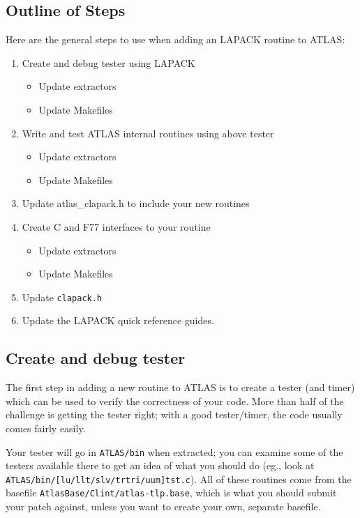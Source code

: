 \documentclass[11pt]{article}
\begin{document}
\subsection{Outline of Steps}
Here are the general steps to use when adding an LAPACK routine to ATLAS:
\begin{enumerate}
\item Create and debug tester using LAPACK
      \begin{itemize}
      \item Update extractors
      \item Update Makefiles
      \end{itemize}
\item Write and test ATLAS internal routines using above tester
      \begin{itemize}
      \item Update extractors
      \item Update Makefiles
      \end{itemize}
\item Update atlas\_clapack.h to include your new routines
\item Create C and F77 interfaces to your routine
      \begin{itemize}
      \item Update extractors
      \item Update Makefiles
      \end{itemize}
\item Update {\tt clapack.h}
\item Update the LAPACK quick reference guides.
\end{enumerate}

\subsection{Create and debug tester}

The first step in adding a new routine to ATLAS is to create a tester
(and timer) which can be used to verify the correctness of your code.
More than half of the challenge is getting the tester right; with a good
tester/timer, the code usually comes fairly easily.

Your tester will go in {\tt ATLAS/bin} when extracted; you can examine
some of the testers available there to get an idea of what you should
do (eg., look at {\tt ATLAS/bin/[lu/llt/slv/trtri/uum]tst.c}).  All of
these routines come from the basefile {\tt AtlasBase/Clint/atlas-tlp.base},
which is what you should submit your patch against, unless you want to create
your own, separate basefile.
\end{document}
